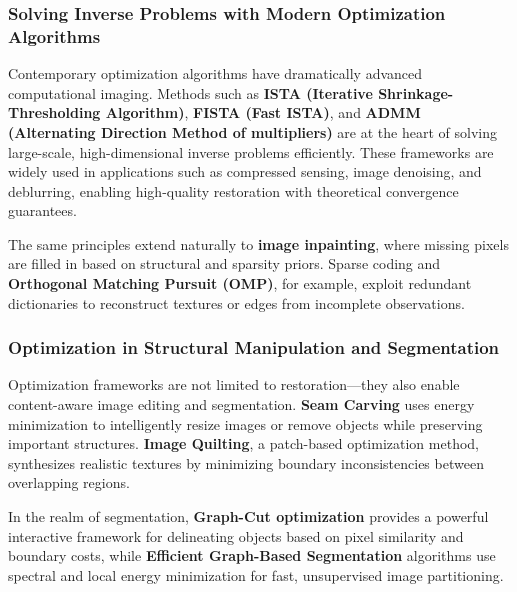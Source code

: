 \documentclass[11pt]{article}
\begin{document}
\hypertarget{solving-inverse-problems-with-modern-optimization-algorithms}{%
\subsubsection{\texorpdfstring{\textbf{Solving Inverse Problems with
Modern Optimization
Algorithms}}{Solving Inverse Problems with Modern Optimization Algorithms}}\label{solving-inverse-problems-with-modern-optimization-algorithms}}

Contemporary optimization algorithms have dramatically advanced
computational imaging. Methods such as \textbf{ISTA (Iterative
Shrinkage-Thresholding Algorithm)}, \textbf{FISTA (Fast ISTA)}, and
\textbf{ADMM (Alternating Direction Method of multipliers)} are at the
heart of solving large-scale, high-dimensional inverse problems
efficiently. These frameworks are widely used in applications such as
compressed sensing, image denoising, and deblurring, enabling
high-quality restoration with theoretical convergence guarantees.

The same principles extend naturally to \textbf{image inpainting}, where
missing pixels are filled in based on structural and sparsity priors.
Sparse coding and \textbf{Orthogonal Matching Pursuit (OMP)}, for
example, exploit redundant dictionaries to reconstruct textures or edges
from incomplete observations.

\hypertarget{optimization-in-structural-manipulation-and-segmentation}{%
\subsubsection{\texorpdfstring{\textbf{Optimization in Structural
Manipulation and
Segmentation}}{Optimization in Structural Manipulation and Segmentation}}\label{optimization-in-structural-manipulation-and-segmentation}}

Optimization frameworks are not limited to restoration---they also
enable content-aware image editing and segmentation. \textbf{Seam
Carving} uses energy minimization to intelligently resize images or
remove objects while preserving important structures. \textbf{Image
Quilting}, a patch-based optimization method, synthesizes realistic
textures by minimizing boundary inconsistencies between overlapping
regions.

In the realm of segmentation, \textbf{Graph-Cut optimization} provides a
powerful interactive framework for delineating objects based on pixel
similarity and boundary costs, while \textbf{Efficient Graph-Based
Segmentation} algorithms use spectral and local energy minimization for
fast, unsupervised image partitioning.
\end{document}
